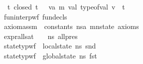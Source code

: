 \begin{isabellebody}
\ \ \ \ \ \ \ \ \ \ \ {\isacharparenleft}{\kern0pt}{\isasymAnd}\ t{\isachardot}{\kern0pt}\ {\isacharparenleft}{\kern0pt}{\isacharparenleft}{\kern0pt}closed\ t{\isacharparenright}{\kern0pt}\ {\isasymLongrightarrow}\ {\isacharparenleft}{\kern0pt}{\isasymexists}\ v{\isacharcolon}{\kern0pt}{\isacharcolon}{\kern0pt}{\isacharparenleft}{\kern0pt}{\isacharprime}{\kern0pt}a{\isacharcomma}{\kern0pt}\ {\isacharprime}{\kern0pt}m{\isacharparenright}{\kern0pt}\ val{\isachardot}{\kern0pt}\ {\isacharparenleft}{\kern0pt}{\isacharparenleft}{\kern0pt}type{\isacharunderscore}{\kern0pt}of{\isacharunderscore}{\kern0pt}val\ v{\isacharparenright}{\kern0pt}\ {\isacharequal}{\kern0pt}\ t{\isacharparenright}{\kern0pt}{\isacharparenright}{\kern0pt}{\isacharparenright}{\kern0pt}{\isacharparenright}{\kern0pt}\ {\isasymLongrightarrow}\isanewline
\ \ \ \ \ \ \ \ \ \ \ {\isacharparenleft}{\kern0pt}fun{\isacharunderscore}{\kern0pt}interp{\isacharunderscore}{\kern0pt}wf\ fun{\isacharunderscore}{\kern0pt}decls\ {\isasymGamma}{\isacharparenright}{\kern0pt}\ {\isasymLongrightarrow}\isanewline
\ \ \ \ \ \ \ \ \ \ \ {\isacharparenleft}{\kern0pt}axiom{\isacharunderscore}{\kern0pt}assm\ {\isasymGamma}\ constants\ {\isacharparenleft}{\kern0pt}ns{\isacharcolon}{\kern0pt}{\isacharcolon}{\kern0pt}{\isacharparenleft}{\kern0pt}{\isacharparenleft}{\kern0pt}{\isacharprime}{\kern0pt}a{\isacharcomma}{\kern0pt}\ {\isacharprime}{\kern0pt}m{\isacharparenright}{\kern0pt}nstate{\isacharparenright}{\kern0pt}{\isacharparenright}{\kern0pt}\ axioms{\isacharparenright}{\kern0pt}\ {\isasymLongrightarrow}\isanewline
\ \ \ \ \ \ \ \ \ \ \ {\isacharparenleft}{\kern0pt}expr{\isacharunderscore}{\kern0pt}all{\isacharunderscore}{\kern0pt}sat\ {\isasymLambda}\ {\isasymGamma}\ {\isacharbrackleft}{\kern0pt}{\isacharbrackright}{\kern0pt}\ ns\ all{\isacharunderscore}{\kern0pt}pres{\isacharparenright}{\kern0pt}\ {\isasymLongrightarrow}\isanewline
\ \ \ \ \ \ \ \ \ \ \ {\isacharparenleft}{\kern0pt}state{\isacharunderscore}{\kern0pt}typ{\isacharunderscore}{\kern0pt}wf\ {\isacharbrackleft}{\kern0pt}{\isacharbrackright}{\kern0pt}\ {\isacharparenleft}{\kern0pt}local{\isacharunderscore}{\kern0pt}state\ ns{\isacharparenright}{\kern0pt}\ {\isacharparenleft}{\kern0pt}snd\ {\isasymLambda}{\isacharparenright}{\kern0pt}{\isacharparenright}{\kern0pt}\ {\isasymLongrightarrow}\isanewline
\ \ \ \ \ \ \ \ \ \ \ {\isacharparenleft}{\kern0pt}state{\isacharunderscore}{\kern0pt}typ{\isacharunderscore}{\kern0pt}wf\ {\isacharbrackleft}{\kern0pt}{\isacharbrackright}{\kern0pt}\ {\isacharparenleft}{\kern0pt}global{\isacharunderscore}{\kern0pt}state\ ns{\isacharparenright}{\kern0pt}\ {\isacharparenleft}{\kern0pt}fst\ {\isasymLambda}{\isacharparenright}{\kern0pt}{\isacharparenright}{\kern0pt}\ {\isasymLongrightarrow}\isanewline

\end{isabellebody}
